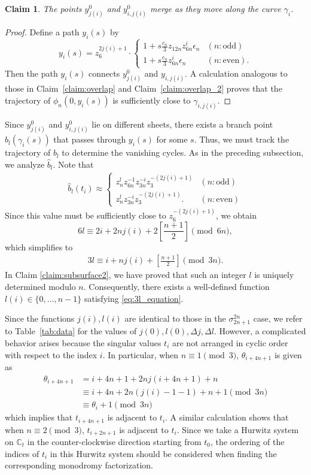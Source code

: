 \documentclass[10pt,a4paper,reqno]{amsart}
\newtheorem{claim}[thm]{Claim}
\theoremstyle{definition}
\numberwithin{equation}{section}
\numberwithin{figure}{section}
\newcommand{\C}{\mathbb{C}}
\newcommand{\ep}{\epsilon}
\begin{document}
\begin{claim}
The points $y_{j(i)}^0$ and $y_{i,j(i)}^0$ merge as they move along the curve $\gamma_i$.
\end{claim}
\begin{proof}
Define a path $y_{i}(s)$ by
\[y_{i}(s)=z_6^{2j(i)+1} \cdot 
\begin{cases} 1+s \frac{c_n}{3} z_{12n}z_{6n}^i {\ep_n} & (n: \text{odd}) \\ 1+s \frac{c_n}{3}z_{6n}^i {\ep_n} & (n: \text{even}). \end{cases}\]
Then the path $y_{i}(s)$ connects $y_{j(i)}^0$ and $y_{i,j(i)}$.
A calculation analogous to those in Claim~\ref{claim:overlap} and Claim~\ref{claim:overlap_2} proves that the trajectory of $\phi_n(0,y_i(s))$ is sufficiently close to $\gamma_{i,j(i)}$.
\end{proof}

Since $y_{j(i)}^0$ and $y_{i,j(i)}^0$ lie on different sheets, there exists a branch point $b_l(\gamma_i(s))$ that passes through $y_i (s)$ for some $s$.
Thus, we must track the trajectory of $b_l$ to determine the vanishing cycles.
As in the preceding subsection, we analyze $\hat{b}_l$.
Note that 
\begin{align*}
\hat{b}_l(t_i)\approx \begin{cases} z_n^l z_{6n}^{-1} z_{3n}^{-i} z_3^{-(2j(i)+1)} & (n: \text{odd}) \\
z_n^l z_{3n}^{-i} z_3^{-(2j(i)+1)}. & (n: \text{even}) \end{cases}
\end{align*}
Since this value must be sufficiently close to $z_6^{-(2j(i)+1)}$, we obtain
\[6l\equiv 2i+ 2nj(i)+2\left[\frac{n+1}{2}\right] \pmod{6n},\]
which simplifies to
\begin{align} \label{eq:3l_equation}
3l \equiv i+nj(i)+\left[\frac{n+1}{2}\right] \pmod{3n}.
\end{align}
In Claim \ref{claim:subsurface2}, we have proved that such an integer $l$ is uniquely determined modulo $n$.
Consequently, there exists a well-defined function $l(i)\in \{0,\dots, n-1\}$ satisfying \eqref{eq:3l_equation}.

Since the functions $j(i), l(i)$ are identical to those in the $\sigma_{2n+1}^{2n}$ case, we refer to Table~\ref{tab:data} for the values of $j(0), l(0), \Delta j, \Delta l$.
However, a complicated behavior arises because the singular values $t_i$ are not arranged in cyclic order with respect to the index $i$.
In particular, when $n\equiv 1 \pmod 3$, $\theta_{i+4n+1}$ is given as
\begin{align*}
\theta_{i+4n+1} & = i+4n+1+2nj(i+4n+1)+n \\
			& \equiv i+4n+2n(j(i)-1-1)+n+1 \pmod{3n} \\
			& \equiv \theta_i +1 \pmod{3n}
\end{align*}
which implies that $t_{i+4n+1}$ is adjacent to $t_{i}$.
A similar calculation shows that when $n\equiv 2 \pmod 3$, $t_{i+2n+1}$ is adjacent to $t_i$.
Since we take a Hurwitz system on $\C_t$ in the counter-clockwise direction starting from $t_0$, 
the ordering of the indices of $t_i$ in this Hurwitz system should be considered when finding the corresponding monodromy factorization.
\end{document}
